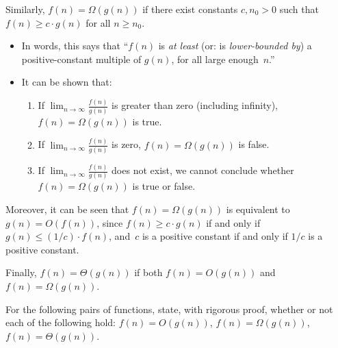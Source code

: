 \documentclass[11pt,addpoints,answers]{exam}
\begin{document}
\begin{questions}
   Similarly, $f(n) = \Omega(g(n))$ if there exist constants $c, n_{0} > 0$ such that $f(n) \geq c \cdot g(n)$ for all $n \geq n_{0}$.
  \begin{itemize}
      \item In words, this says that ``$f(n)$ is \emph{at least} (or: is \emph{lower-bounded by}) a positive-constant multiple of $g(n)$, for all large enough~$n$.''
      \item It can be shown that:
      \begin{enumerate}
          \item If $\lim_{n \to \infty} \frac{f(n)}{g(n)}$ is greater than zero (including infinity), $f(n) = \Omega(g(n))$ is true.
          \item If $\lim_{n \to \infty} \frac{f(n)}{g(n)}$ is zero, $f(n) = \Omega(g(n))$ is false.
          \item If $\lim_{n \to \infty} \frac{f(n)}{g(n)}$ does not exist, we cannot conclude whether $f(n) = \Omega(g(n))$ is true or false. 
      \end{enumerate}
  \end{itemize}
  
  
  Moreover, it can be seen that $f(n) = \Omega(g(n))$ is equivalent to $g(n) = O(f(n))$, since $f(n) \geq c \cdot g(n)$ if and only if $g(n) \leq (1/c) \cdot f(n)$, and~$c$ is a positive constant if and only if $1/c$ is a positive constant.
  
  Finally, $f(n) = \Theta(g(n))$ if both $f(n) = O(g(n))$ and $f(n) = \Omega(g(n))$.

  For the following pairs of functions, state, with rigorous proof, whether or not each of the following hold: $f(n) = O(g(n))$, $f(n) = \Omega(g(n))$, $f(n) = \Theta(g(n))$.


\end{questions}
\end{document}
